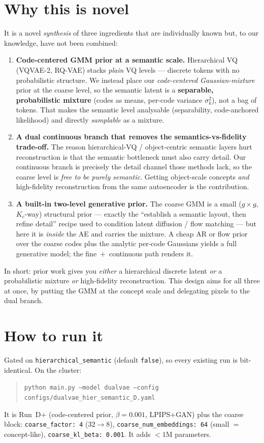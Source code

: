 \documentclass[11pt]{article}
\newcommand{\code}[1]{\texttt{#1}}
\begin{document}
\section{Why this is novel}
It is a novel \emph{synthesis} of three ingredients that are individually known but, to our knowledge,
have not been combined:
\begin{enumerate}
  \item \textbf{Code-centered GMM prior at a semantic scale.} Hierarchical VQ (VQVAE-2, RQ-VAE) stacks
  \emph{plain} VQ levels --- discrete tokens with no probabilistic structure. We instead place our
  \emph{code-centered Gaussian-mixture} prior at the coarse level, so the semantic latent is a
  \textbf{separable, probabilistic mixture} (codes as means, per-code variance $\sigma_k^2$), not a bag
  of tokens. That makes the semantic level analysable (separability, code-anchored likelihood) and
  directly \emph{samplable} as a mixture.
  \item \textbf{A dual continuous branch that removes the semantics-vs-fidelity trade-off.} The reason
  hierarchical-VQ / object-centric semantic layers hurt reconstruction is that the semantic bottleneck
  must also carry detail. Our continuous branch is precisely the detail channel those methods lack, so
  the coarse level is \emph{free to be purely semantic}. Getting object-scale concepts \emph{and}
  high-fidelity reconstruction from the same autoencoder is the contribution.
  \item \textbf{A built-in two-level generative prior.} The coarse GMM is a small
  ($g{\times}g$, $K_c$-way) structural prior --- exactly the ``establish a semantic layout, then refine
  detail'' recipe used to condition latent diffusion / flow matching --- but here it is \emph{inside}
  the AE and carries the mixture. A cheap AR or flow prior over the coarse codes plus the analytic
  per-code Gaussians yields a full generative model; the fine~$+$~continuous path renders it.
\end{enumerate}
In short: prior work gives you \emph{either} a hierarchical discrete latent \emph{or} a probabilistic
mixture \emph{or} high-fidelity reconstruction. This design aims for all three at once, by putting the
GMM at the concept scale and delegating pixels to the dual branch.

\section{How to run it}
Gated on \code{hierarchical\_semantic} (default \code{false}), so every existing run is bit-identical.
On the cluster:
\begin{quote}
\code{python main.py --model dualvae --config configs/dualvae\_hier\_semantic\_D.yaml}
\end{quote}
It is Run~D+ (code-centered prior, $\beta{=}0.001$, LPIPS+GAN) plus the coarse block:
\code{coarse\_factor: 4} ($32{\to}8$), \code{coarse\_num\_embeddings: 64} (small $=$ concept-like),
\code{coarse\_kl\_beta: 0.001}. It adds $<\!1$M parameters.
\end{document}
